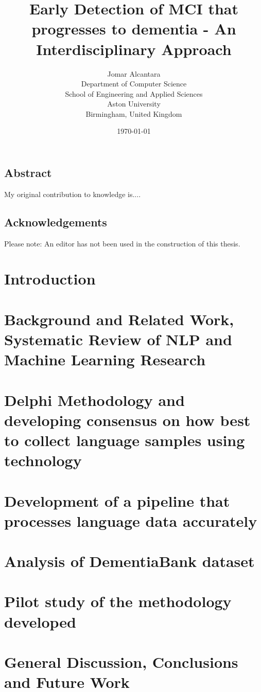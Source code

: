 \documentclass[10pt, letterpaper, twoside, openany]{thesis}
\title{Early Detection of MCI that progresses to dementia - An Interdisciplinary Approach}
\author{
        Jomar Alcantara \\
        Department of Computer Science \\
        School of Engineering and Applied Sciences \\
        Aston University\\
        Birmingham, United Kingdom
}
\date{\today}
\begin{document}
\maketitle
\newpage
\section*{Abstract}
My original contribution to knowledge is....
\newpage
\section*{Acknowledgements}
Please note: An editor has not been used in the construction of this thesis.
\newpage
\tableofcontents
\newpage
\listoffigures
\listoftables

\chapter{Introduction}


\chapter{Background and Related Work, Systematic Review of NLP and Machine Learning Research}


\chapter{Delphi Methodology and developing consensus on how best to collect language samples using technology}


\chapter{Development of a pipeline that processes language data accurately}


\chapter{Analysis of DementiaBank dataset}


\chapter{Pilot study of the methodology developed}


\chapter{General Discussion, Conclusions and Future Work}




\end{document}
